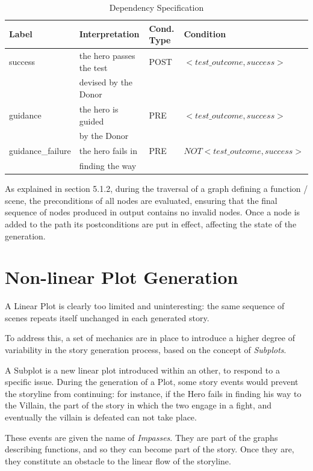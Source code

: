 \documentclass[12pt,a4paper,oneside]{report}
\begin{document}
\begin{table}[H]
\caption{Dependency Specification}
\label{tab:dependency}
\bigskip
\begin{tabular}{| l | l | l | l |}
\hline
Label & Interpretation & Cond. Type & Condition \\
\hline
success & the hero passes the test& POST & \(<test\_outcome,success>\) \\
 & devised by the Donor&  & \\
\hline
guidance & the hero is guided & PRE & \(<test\_outcome,success>\) \\
 &by the Donor&  & \\
\hline
guidance\_failure & the hero fails in & PRE & \(NOT<test\_outcome,success>\) \\
 & finding the way&  & \\
\hline

\end{tabular}
\end{table}

As explained in section 5.1.2, during the traversal of a graph defining a function / scene, the preconditions of all nodes are evaluated, ensuring that the final sequence of nodes produced in output contains no invalid nodes. Once a node is added to the path its postconditions are put in effect, affecting the state of the generation.

\pagebreak

\section{Non-linear Plot Generation}
A Linear Plot is clearly too limited and uninteresting: the same sequence of scenes repeats itself unchanged in each generated story.

To address this, a set of mechanics are in place to introduce a higher degree of variability in the story generation process, based on the concept of \textit{Subplots}. 

\bigskip

A Subplot is a new linear plot introduced within an other, to respond to a specific issue. During the generation of a Plot, some story events would prevent the storyline from continuing: for instance, if the Hero fails in finding his way to the Villain, the part of the story in which the two engage in a fight, and eventually the villain is defeated can not take place.

These events are given the name of \textit{Impasses}. They are part of the graphs describing functions, and so they can become part of the story. Once they are, they constitute an obstacle to the linear flow of the storyline.
\end{document}
